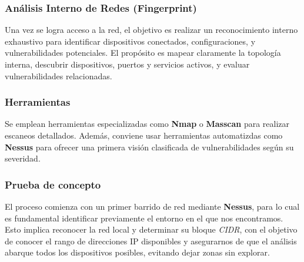 \documentclass[a4paper, 11pt]{article}
\begin{document}
\par\vspace{0.5cm}
































\subsubsection{Análisis Interno de Redes (Fingerprint)}

Una vez se logra acceso a la red, el objetivo es realizar un reconocimiento interno exhaustivo para identificar dispositivos conectados, configuraciones, y vulnerabilidades potenciales. El propósito es mapear claramente la topología interna, descubrir dispositivos, puertos y servicios activos, y evaluar vulnerabilidades relacionadas.

\par\vspace{0.5cm}
\subsubsection*{Herramientas}
Se emplean herramientas especializadas como \textbf{Nmap} o \textbf{Masscan} para realizar escaneos detallados. Además, conviene usar 
herramientas automatizdas como \textbf{Nessus} para ofrecer una primera visión clasificada de vulnerabilidades según su severidad.

\par\vspace{0.5cm}
\subsubsection*{Prueba de concepto}
El proceso comienza con un primer barrido de red mediante \textbf{Nessus}, para lo cual es fundamental identificar previamente el entorno en el que nos encontramos. Esto implica reconocer la red local y determinar su bloque \textit{CIDR}, con el objetivo de conocer el rango de direcciones IP disponibles y asegurarnos de que el análisis abarque todos los dispositivos posibles, evitando dejar zonas sin explorar.
\par\vspace{0.5cm}
\end{document}
